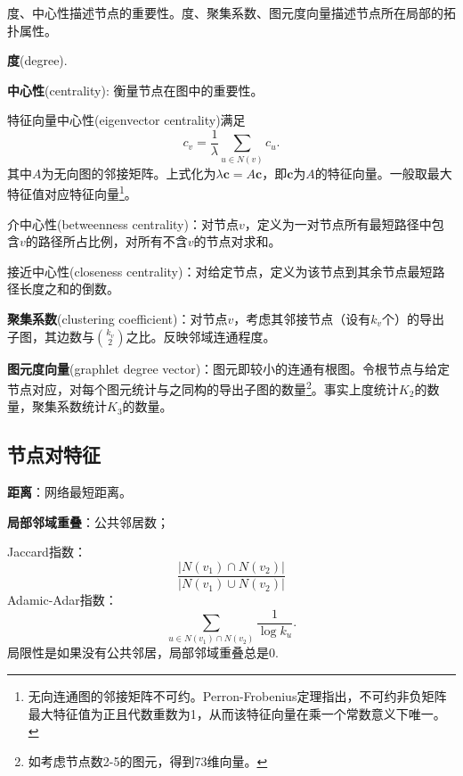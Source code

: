 度、中心性描述节点的重要性。度、聚集系数、图元度向量描述节点所在局部的拓扑属性。

\par \textbf{度}(degree).

\par \textbf{中心性}(centrality): 衡量节点在图中的重要性。
\par 特征向量中心性(eigenvector centrality)满足
\begin{equation}
    c_v=\frac{1}{\lambda}\sum_{u\in N(v)} c_u.
\end{equation}
其中$A$为无向图的邻接矩阵。上式化为$\lambda \mathbf{c}=A\mathbf{c}$，即$\mathbf{c}$为$A$的特征向量。一般取最大特征值对应特征向量\footnote{无向连通图的邻接矩阵不可约。Perron-Frobenius定理指出，不可约非负矩阵最大特征值为正且代数重数为1，从而该特征向量在乘一个常数意义下唯一。}。
\par 介中心性(betweenness centrality)：对节点$v$，定义为一对节点所有最短路径中包含$v$的路径所占比例，对所有不含$v$的节点对求和。
\par 接近中心性(closeness centrality)：对给定节点，定义为该节点到其余节点最短路径长度之和的倒数。

\par \textbf{聚集系数}(clustering coefficient)：对节点$v$，考虑其邻接节点（设有$k_v$个）的导出子图，其边数与$\binom{k_v}{2}$之比。反映邻域连通程度。
\par \textbf{图元度向量}(graphlet degree vector)：图元即较小的连通有根图。令根节点与给定节点对应，对每个图元统计与之同构的导出子图的数量\footnote{如考虑节点数2-5的图元，得到73维向量。}。事实上度统计$K_2$的数量，聚集系数统计$K_3$的数量。


\subsection{节点对特征}

\par \textbf{距离}：网络最短距离。
\par \textbf{局部邻域重叠}：公共邻居数；
\par Jaccard指数：
\begin{equation}
    \frac{\vert N(v_1)\cap N(v_2)\vert}{\vert N(v_1)\cup N(v_2)\vert}
\end{equation}
Adamic-Adar指数：
\begin{equation}
    \sum_{u\in N(v_1)\cap N(v_2)} \frac{1}{\log k_u}.
\end{equation}
局限性是如果没有公共邻居，局部邻域重叠总是0.

